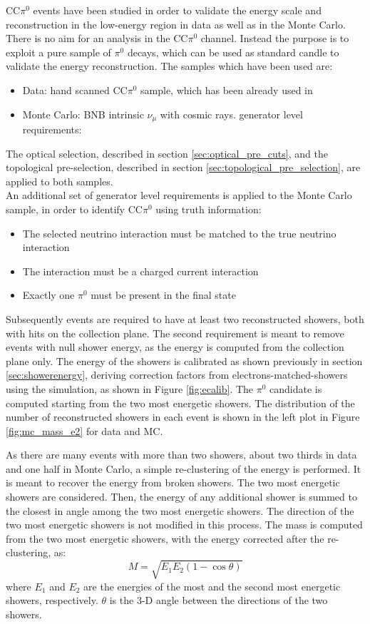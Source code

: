 CC$\pi^0$ events have been studied in order to validate the energy scale and reconstruction in the low-energy region in data as well as in the Monte Carlo. There is no aim for an analysis in the CC$\pi^0$ channel. Instead the purpose is to exploit a pure sample of $\pi^0$ decays, which can be used as standard candle to validate the energy reconstruction.
The samples which have been used are:
\begin{itemize}
  \item Data: hand scanned CC$\pi^0$ sample, which has been already used in \cite{caratelli}
  \item Monte Carlo: BNB intrinsic $\nu_{\mu}$ with cosmic rays. generator level requirements:
\end{itemize}
The optical selection, described in section \ref{sec:optical_pre_cuts}, and the topological pre-selection, described in section \ref{sec:topological_pre_selection}, are applied to both samples.\\
An additional set of generator level requirements is applied to the Monte Carlo sample, in order to identify CC$\pi^0$ using truth information:
\begin{itemize}
    \item The selected neutrino interaction must be matched to the true neutrino interaction
    \item The interaction must be a charged current interaction
    \item Exactly one $\pi^0$ must be present in the final state
\end{itemize}
Subsequently events are required to have at least two reconstructed showers, both with hits on the collection plane. The second requirement is meant to remove events with null shower energy, as the energy is computed from the collection plane only. The energy of the showers is calibrated as shown previously in section \ref{sec:showerenergy}, deriving correction factors from electrons-matched-showers using the simulation, as shown in Figure \ref{fig:ecalib}.
The $\pi^0$ candidate is computed starting from the two most energetic showers. The distribution of the number of reconstructed showers in each event is shown in the left plot in Figure \ref{fig:mc_mass_e2} for data and MC.

As there are many events with more than two showers, about two thirds in data and one half in Monte Carlo, a simple re-clustering of the energy is performed. It is meant to recover the energy from broken showers. The two most energetic showers are considered. Then, the energy of any additional shower is summed to the closest in angle among the two most energetic showers. The direction of the two most energetic showers is not modified in this process. The mass is computed from the two most energetic showers, with the energy corrected after the re-clustering, as:
\[ M = \sqrt{E_1 E_2 (1 - \cos\theta)} \]
where $E_1$ and $E_2$ are the energies of the most and the second most energetic showers, respectively. $\theta$ is the 3-D angle between the directions of the two showers.

